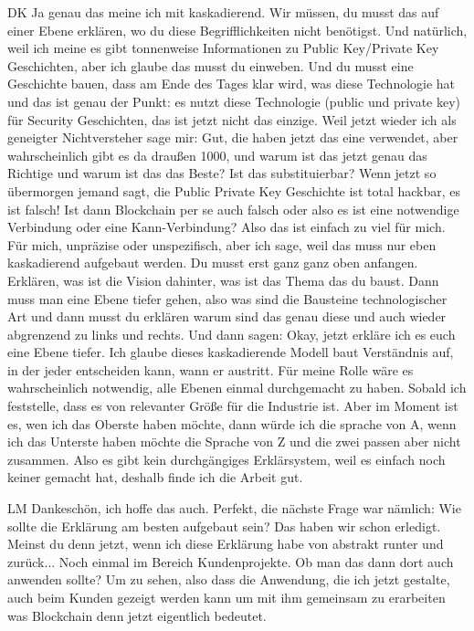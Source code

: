 \begin{xlist}
     \item[DK] Ja genau das meine ich mit kaskadierend. Wir müssen, du musst das auf einer Ebene erklären, wo du diese Begrifflichkeiten nicht benötigst. Und natürlich, weil ich meine es gibt tonnenweise Informationen zu Public Key/Private Key Geschichten, aber ich glaube das musst du einweben. Und du musst eine Geschichte bauen, dass am Ende des Tages klar wird, was diese Technologie hat und das ist genau der Punkt: es nutzt diese Technologie (public und private key) für Security Geschichten, das ist jetzt nicht das einzige. Weil jetzt wieder ich als geneigter Nichtversteher sage mir: Gut, die haben jetzt das eine verwendet, aber wahrscheinlich gibt es da draußen 1000, und warum ist das jetzt genau das Richtige und warum ist das das Beste? Ist das substituierbar? Wenn jetzt so übermorgen jemand sagt, die Public Private Key Geschichte ist total hackbar, es ist falsch! Ist dann Blockchain per se auch falsch oder also es ist eine notwendige Verbindung oder eine Kann-Verbindung? Also das ist einfach zu viel für mich. Für mich, unpräzise oder unspezifisch, aber ich sage, weil das muss nur eben kaskadierend aufgebaut werden. Du musst erst ganz ganz oben anfangen. Erklären, was ist die Vision dahinter, was ist das Thema das du baust. Dann muss man eine Ebene tiefer gehen, also was sind die Bausteine technologischer Art und dann musst du erklären warum sind das genau diese und auch wieder abgrenzend zu links und rechts. Und dann sagen: Okay, jetzt erkläre ich es euch eine Ebene tiefer. Ich glaube dieses kaskadierende Modell baut Verständnis auf, in der jeder entscheiden kann, wann er austritt.  Für meine Rolle wäre es wahrscheinlich notwendig, alle Ebenen einmal durchgemacht zu haben. Sobald ich feststelle, dass es von relevanter Größe für die Industrie ist. Aber im Moment ist es, wen ich das Oberste haben möchte, dann würde ich die sprache von A, wenn ich das Unterste haben möchte die Sprache von Z und die zwei passen aber nicht zusammen. Also es gibt kein durchgängiges Erklärsystem, weil es einfach noch keiner gemacht hat, deshalb finde ich die Arbeit gut. 
     \item[LM] Dankeschön, ich hoffe das auch. Perfekt, die nächste Frage war nämlich: Wie sollte die Erklärung am besten aufgebaut sein? Das haben wir schon erledigt. Meinst du denn jetzt, wenn ich diese Erklärung habe von abstrakt runter und zurück... Noch einmal im Bereich Kundenprojekte. Ob man das dann dort auch anwenden sollte? Um zu sehen, also dass die Anwendung, die ich jetzt gestalte, auch beim Kunden gezeigt werden kann um mit ihm gemeinsam zu erarbeiten was Blockchain denn jetzt eigentlich bedeutet.

\end{xlist}
